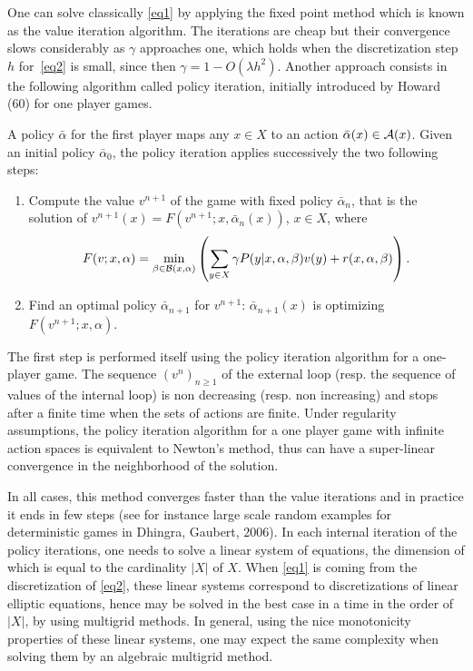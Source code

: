 \documentclass{report}
\begin{document}
One can solve classically \eqref{eq1} by applying
the fixed point method which is
known as the value iteration algorithm.
The iterations are cheap but their convergence
slows considerably
as $\gamma$ approaches one, which holds
when the discretization step $h$ for~\eqref{eq2} is small,
since then $\gamma=1-O(\lambda h^2)$.
Another approach consists in the following
algorithm called policy iteration, initially introduced by Howard
(60) for one player games.

A policy $\bar{\alpha}$ for the first player
maps any $x\in X$ to an action ${\bar{\alpha}}(x)\in \mathcal{A}(x)$.
Given an initial policy $\bar{\alpha}_0$, the
policy iteration applies successively the two following
steps:
\begin{enumerate}
\item Compute the value $v^{n+1}$ of the game with fixed policy
$\bar{\alpha}_n$, that is the solution of
$v^{n+1}(x) = F(v^{n+1}; x,\bar{\alpha}_n(x))$, $x \in X$, where
$$
F(v; x, \alpha) = \min_{\beta \in \mathcal{B}(x,\alpha)} \left( \sum_{y \in X} \gamma P(y|x, \alpha, \beta) v(y) + r(x,\alpha, \beta) \right) .
$$

\item Find an optimal policy $\bar{\alpha}_{n+1}$ for $v^{n+1}$:
$\bar{\alpha}_{n+1}(x)$ is optimizing $F (v^{n+1};x,\alpha)$.
\end{enumerate}

The first step is performed itself using the policy iteration
algorithm for a one-player game.
The sequence $(v^n)_{n\geq 1}$ of the external loop (resp. the sequence of values
of the internal
loop) is non decreasing (resp. non increasing) and stops after a
finite time when the sets of actions are finite.
Under regularity assumptions, the policy
iteration algorithm for a one player game with infinite action spaces
is equivalent to Newton's method, thus can have a
super-linear convergence in the neighborhood of the solution.

In all cases, this method converges faster than the
value iterations and in practice it ends in few steps
(see for instance large scale random examples for deterministic games
in Dhingra, Gaubert, 2006).
In each internal iteration of the policy iterations, one needs to
solve a linear system of equations,
the dimension of which is equal to the cardinality $|X|$
of $X$.
When \eqref{eq1} is coming from the discretization of
\eqref{eq2}, these linear systems correspond to discretizations of linear
elliptic equations, hence may be solved in the
best case in a time in the order of $|X|$,
by using multigrid methods.
In general, using the nice monotonicity properties of these linear
systems, one may expect the same complexity when solving
them by an algebraic multigrid method.
\end{document}
